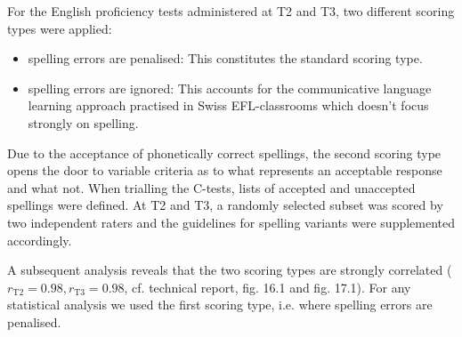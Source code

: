 \documentclass[output=paper]{langsci/langscibook}
\begin{document}
For the English proficiency tests administered at T2 and T3, two different scoring types were applied: 

\begin{itemize}
\item
spelling errors are penalised: This constitutes the standard scoring type.
\item
spelling errors are ignored: This accounts for the communicative language learning approach practised in Swiss EFL-classrooms which doesn’t focus strongly on spelling.
\end{itemize}

Due to the acceptance of phonetically correct spellings, the second scoring type opens the door to variable criteria as to what represents an acceptable response and what not. When trialling the C-tests, lists of accepted and unaccepted spellings were defined. At T2 and T3, a randomly selected subset was scored by two independent raters and the guidelines for spelling variants were supplemented accordingly. 

A subsequent analysis reveals that the two scoring types are strongly correlated ($r_{\text{T2}}=0.98, r_{\text{T3}}=0.98$, cf. technical report, fig. 16.1 and fig. 17.1). For any statistical analysis we used the first scoring type, i.e. where spelling errors are penalised.
\sloppy\printbibliography[heading=subbibliography,notkeyword=this]
\end{document}
